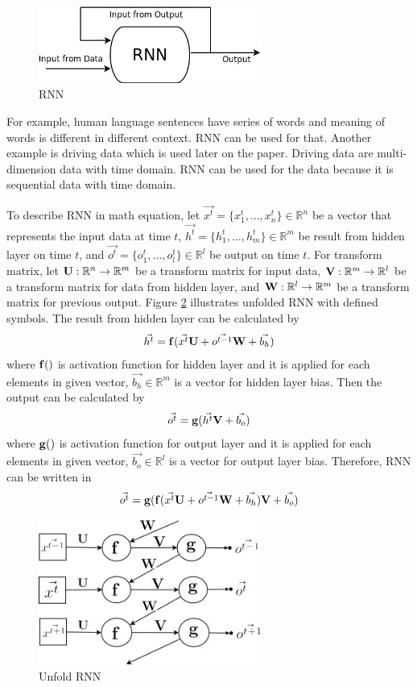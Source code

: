 \documentclass[draft,dvipsnames]{drexel-thesis}
\begin{document}
\begin{thesis}
\begin{figure}[t!]
    \centering
    \includegraphics[width=0.65\textwidth]{pictures/figures/RNN.png}
    \caption{RNN}
    \label{fig:RNN}
\end{figure}
	
	For example, human language sentences have series of words and meaning of words is different in different context. RNN can be used for that. Another example is driving data which is used later on the paper.  Driving data are multi-dimension data with time domain. RNN can be used for the data because it is sequential data with time domain.
	
	To describe RNN in math equation, let $\vec{x^t} = \{ x_1^t, ..., x_n^t\} \in \mathbb{R}^n$ be a vector that represents the input data at time $t$, $\vec{h^t} = \{ h_1^t, ..., h_m^t\} \in \mathbb{R}^m$ be result from hidden layer on time $t$, and $\vec{o^t} = \{ o_1^t, ..., o_l^t\} \in \mathbb{R}^l$ be output on time $t$. For transform matrix, let $\bold{U}: \mathbb{R}^n \rightarrow \mathbb{R}^m$ be a transform matrix for input data, $\bold{V}: \mathbb{R}^m \rightarrow \mathbb{R}^l$ be a transform matrix for data from hidden layer, and $\bold{W}: \mathbb{R}^l \rightarrow \mathbb{R}^m$ be a transform matrix for previous output. Figure \ref{fig:unfold_RNN} illustrates unfolded RNN with defined symbols. The result from hidden layer can be calculated by 
	$$\vec{h^t} = \bold{f}(\vec{x^t}\bold{U} + \vec{o^{t-1}}\bold{W} + \vec{b_h})$$ where $\bold{f}()$ is activation function for hidden layer and it is applied for each elements in given vector, $\vec{b_h} \in \mathbb{R}^m$ is a vector for hidden layer bias. Then the output can be calculated by
	$$\vec{o^t} = \bold{g}(\vec{h^t}\bold{V}+\vec{b_o})$$ where $\bold{g}()$ is activation function for output layer and it is applied for each elements in given vector, $\vec{b_o} \in \mathbb{R}^l$ is a vector for output layer bias. Therefore, RNN can be written in
	$$\vec{o^t} = \bold{g}(\bold{f}(\vec{x^t}\bold{U} + \vec{o^{t-1}}\bold{W} + \vec{b_h})\bold{V}+\vec{b_o})$$
	
\begin{figure}[t!]
    \centering
    \includegraphics[width=0.65\textwidth]{pictures/figures/unfold_RNN.png}
    \caption{Unfold RNN}
    \label{fig:unfold_RNN}
\end{figure}


\end{thesis}
\end{document}
